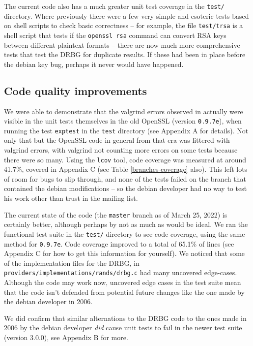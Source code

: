 \documentclass[conference]{IEEEtran}
\begin{document}
The current code also has a much greater unit test coverage in the
\verb|test/| directory. Where previously there were a few very simple
and esoteric tests based on shell scripts to check basic correctness
-- for example, the file \verb|test/trsa| is a shell script that tests
if the \verb|openssl rsa| command can convert RSA keys between
different plaintext formats -- there are now much more comprehensive
tests that test the DRBG for duplicate results. If these had been in
place before the debian key bug, perhaps it never would have happened.

\subsection{Code quality improvements}
We were able to demonstrate that the valgrind errors observed in
\cite{2} actually were visible in the unit tests themselves in the old
OpenSSL (version \verb|0.9.7e|), when running the test \verb|exptest|
in the \verb|test| directory (see Appendix A for details). Not only
that but the OpenSSL code in general from that era was littered with
valgrind errors, with valgrind not counting more errors on some tests
because there were so many. Using the \verb|lcov| tool, code coverage
was measured at around 41.7\%, covered in Appendix C (see Table
\ref{branches-coverage} also). This left lots of room for bugs to slip
through, and none of the tests failed on the branch that contained the
debian modifications -- so the debian developer had no way to test his
work other than trust in the mailing list.

The current state of the code (the \verb|master| branch as of March
25, 2022) is certainly better, although perhaps by not as much as
would be ideal. We ran the functional test suite in the \verb|test/|
directory to see code coverage, using the same method for
\verb|0.9.7e|. Code coverage improved to a total of 65.1\% of lines (see
Appendix C for how to get this information for yourself). We noticed
that some of the implementation files for the DRBG, in
\verb|providers/implementations/rands/drbg.c| had many uncovered
edge-cases. Although the code may work now, uncovered edge cases in
the test suite mean that the code isn't defended from potential future
changes like the one made by the debian developer in 2006.

We did confirm that similar alternations to the DRBG code to the ones
made in 2006 by the debian developer \emph{did} cause unit tests to
fail in the newer test suite (version 3.0.0), see Appendix B for more.
\end{document}

